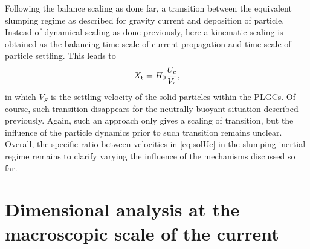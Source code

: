 \documentclass[twocolumn]{article}
\begin{document}
Following the balance scaling as done far, a transition between the equivalent slumping regime as described for gravity current and deposition of particle. Instead of dynamical scaling as done previously, here a kinematic scaling is obtained as the balancing time scale of current propagation and time scale of particle settling. This leads to
\begin{equation}
	\label{eq:Xt_settling}
	X_{\rm t}=H_0\frac{U_c}{V_s},
\end{equation}
in which $V_S$ is the settling velocity of the solid particles within the PLGCs. Of course, such transition disappears for the neutrally-buoyant situation described previously.
Again, such an approach only gives a scaling of transition, but the influence of the particle dynamics prior to such transition remains unclear.
Overall, the specific ratio between velocities in \eqref{eq:solUc} in the slumping inertial regime remains to clarify varying the influence of the mechanisms discussed so far.

\section{Dimensional analysis at the macroscopic scale of the current}
\label{sec:dimensionlessmap}
\end{document}
